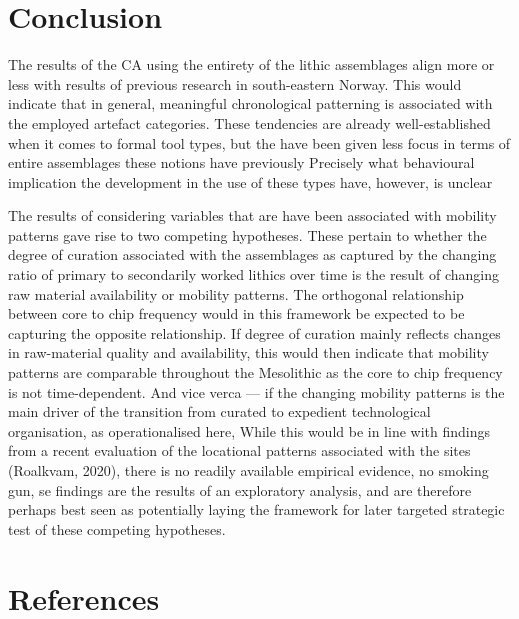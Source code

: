 \documentclass[
]{article}
\begin{document}
\hypertarget{conclusion}{%
\section{Conclusion}\label{conclusion}}

The results of the CA using the entirety of the lithic assemblages align more or less with results of previous research in south-eastern Norway. This would indicate that in general, meaningful chronological patterning is associated with the employed artefact categories. These tendencies are already well-established when it comes to formal tool types, but the have been given less focus in terms of entire assemblages these notions have previously Precisely what behavioural implication the development in the use of these types have, however, is unclear

The results of considering variables that are have been associated with mobility patterns gave rise to two competing hypotheses. These pertain to whether the degree of curation associated with the assemblages as captured by the changing ratio of primary to secondarily worked lithics over time is the result of changing raw material availability or mobility patterns. The orthogonal relationship between core to chip frequency would in this framework be expected to be capturing the opposite relationship. If degree of curation mainly reflects changes in raw-material quality and availability, this would then indicate that mobility patterns are comparable throughout the Mesolithic as the core to chip frequency is not time-dependent. And vice verca --- if the changing mobility patterns is the main driver of the transition from curated to expedient technological organisation, as operationalised here, While this would be in line with findings from a recent evaluation of the locational patterns associated with the sites (Roalkvam, 2020), there is no readily available empirical evidence, no smoking gun, se findings are the results of an exploratory analysis, and are therefore perhaps best seen as potentially laying the framework for later targeted strategic test of these competing hypotheses.

\newpage

\hypertarget{references}{%
\section{References}\label{references}}
\end{document}
